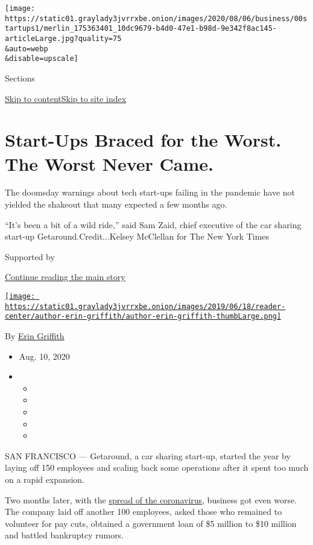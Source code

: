 \texttt{[image: https://static01.graylady3jvrrxbe.onion/images/2020/08/06/business/00startups1/merlin\_175363401\_10dc9679-b4d0-47e1-b98d-9e342f8ac145-articleLarge.jpg?quality=75\\\&auto=webp\\\&disable=upscale]}

Sections

\protect\hyperlink{site-content}{Skip to
content}\protect\hyperlink{site-index}{Skip to site index}

\hypertarget{start-ups-braced-for-the-worst-the-worst-never-came}{%
\section{Start-Ups Braced for the Worst. The Worst Never
Came.}\label{start-ups-braced-for-the-worst-the-worst-never-came}}

The doomsday warnings about tech start-ups failing in the pandemic have
not yielded the shakeout that many expected a few months ago.

``It's been a bit of a wild ride,'' said Sam Zaid, chief executive of
the car sharing start-up Getaround.Credit...Kelsey McClellan for The New
York Times

Supported by

\protect\hyperlink{after-sponsor}{Continue reading the main story}

\href{https://www.nytimes3xbfgragh.onion/by/erin-griffith}{\texttt{[image: https://static01.graylady3jvrrxbe.onion/images/2019/06/18/reader-center/author-erin-griffith/author-erin-griffith-thumbLarge.png]}}

By \href{https://www.nytimes3xbfgragh.onion/by/erin-griffith}{Erin
Griffith}

\begin{itemize}
\item
  Aug. 10, 2020
\item
  \begin{itemize}
  \item
  \item
  \item
  \item
  \item
  \end{itemize}
\end{itemize}

SAN FRANCISCO --- Getaround, a car sharing start-up, started the year by
laying off 150 employees and scaling back some operations after it spent
too much on a rapid expansion.

Two months later, with the
\href{https://www.nytimes3xbfgragh.onion/news-event/coronavirus?action=click\&pgtype=Article\&state=default\&module=styln-coronavirus\&region=TOP_BANNER\&context=storylines_menu}{spread
of the coronavirus}, business got even worse. The company laid off
another 100 employees, asked those who remained to volunteer for pay
cuts, obtained a government loan of \$5 million to \$10 million and
battled bankruptcy rumors.

